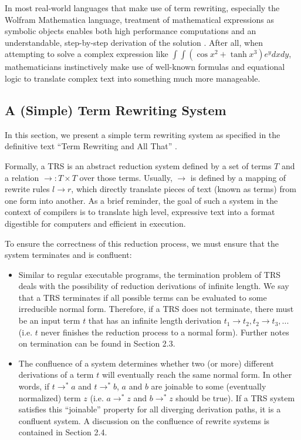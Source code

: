\documentclass{article}
\begin{document}
In most real-world languages that make use of term rewriting, especially the Wolfram Mathematica language,
treatment of mathematical expressions as symbolic objects enables both high performance computations
and an understandable, step-by-step derivation of the solution \cite{buchberger1996mathematica,mircea2004rule}. After all, when attempting to solve
a complex expression like $\int \int (\cos{x}^2 + \tanh{x}^3)e^y dx dy$, mathematicians instinctively make use
of well-known formulas and equational logic to translate complex text into something much more manageable.

\subsection{A (Simple) Term Rewriting System}

In this section, we present a simple term rewriting system as specified in the definitive text ``Term Rewriting and All That'' \cite{baader1998term}.

Formally, a TRS is an abstract reduction system defined by a set of terms $T$ and a relation $\rightarrow: T \times T$ over those terms.
Usually, $\rightarrow$ is defined by a mapping of rewrite rules $l \rightarrow r$, which directly translate pieces of text (known as terms) from one form into another.
As a brief reminder, the goal of such a system in the context of compilers is to translate high level, expressive text into a format digestible for computers and efficient in execution.

To ensure the correctness of this reduction process,
we must ensure that the system terminates and is confluent:
\begin{itemize}
    \item
    Similar to regular executable programs, the termination problem of TRS deals with the possibility of reduction derivations of infinite length.
    We say that a TRS terminates if all possible terms can be evaluated to some irreducible normal form. Therefore, if a TRS does not terminate,
    there must be an input term $t$ that has an infinite length derivation $t_1 \rightarrow t_2, t_2 \rightarrow t_3, ...$
    (i.e. $t$ never finishes the reduction process to a normal form).
    Further notes on termination can be found in Section 2.3.
    \item
    The confluence of a system determines whether two (or more) different derivations of a term $t$ will eventually reach the same normal form.
    In other words, if $t \rightarrow^* a$ and $t \rightarrow^* b$,
    $a$ and $b$ are joinable to some (eventually normalized) term $z$
    (i.e. $a \rightarrow^* z$ and $b \rightarrow^* z$ should be true).
    If a TRS system satisfies this ``joinable'' property for all diverging derivation paths, it is a confluent system.
    A discussion on the confluence of rewrite systems is contained in Section 2.4.
\end{itemize}
\end{document}
